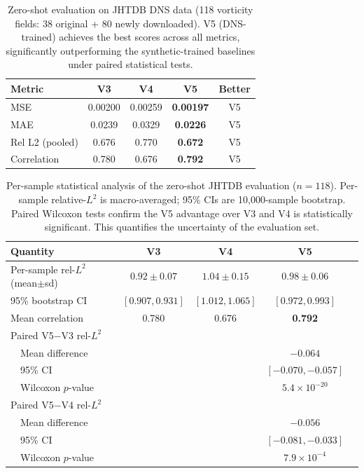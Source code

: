 \documentclass[review]{elsarticle}
\begin{document}
\begin{table}[t]
\centering
\caption{Zero-shot evaluation on JHTDB DNS data (118 vorticity fields: 38 original + 80 newly downloaded). V5 (DNS-trained) achieves the best scores across all metrics, significantly outperforming the synthetic-trained baselines under paired statistical tests.}
\label{tab:jhtdb}
\begin{tabular}{lcccc}
\toprule
Metric & V3 & V4 & V5 & Better \\
\midrule
MSE & 0.00200 & 0.00259 & \textbf{0.00197} & V5 \\
MAE & 0.0239 & 0.0329 & \textbf{0.0226} & V5 \\
Rel L2 (pooled) & 0.676 & 0.770 & \textbf{0.672} & V5 \\
Correlation & 0.780 & 0.676 & \textbf{0.792} & V5 \\
\bottomrule
\end{tabular}
\end{table}

\begin{table}[t]
\centering
\caption{Per-sample statistical analysis of the zero-shot JHTDB evaluation ($n{=}118$). Per-sample relative-$L^2$ is macro-averaged; 95\% CIs are 10{,}000-sample bootstrap. Paired Wilcoxon tests confirm the V5 advantage over V3 and V4 is statistically significant. This quantifies the uncertainty of the evaluation set.}
\label{tab:jhtdb-stats}
\begin{tabular}{lcccc}
\toprule
Quantity & V3 & V4 & V5 & \\
\midrule
Per-sample rel-$L^2$ (mean$\pm$sd) & $0.92 \pm 0.07$ & $1.04 \pm 0.15$ & $0.98 \pm 0.06$ & \\
95\% bootstrap CI & $[0.907, 0.931]$ & $[1.012, 1.065]$ & $[0.972, 0.993]$ & \\
Mean correlation & 0.780 & 0.676 & \textbf{0.792} & \\
\midrule
\multicolumn{3}{l}{Paired V5$-$V3 rel-$L^2$} & & \\
\multicolumn{3}{l}{\ \ Mean difference} & $-0.064$ & \\
\multicolumn{3}{l}{\ \ 95\% CI} & $[-0.070, -0.057]$ & \\
\multicolumn{3}{l}{\ \ Wilcoxon $p$-value} & $5.4\times10^{-20}$ & \\
\midrule
\multicolumn{3}{l}{Paired V5$-$V4 rel-$L^2$} & & \\
\multicolumn{3}{l}{\ \ Mean difference} & $-0.056$ & \\
\multicolumn{3}{l}{\ \ 95\% CI} & $[-0.081, -0.033]$ & \\
\multicolumn{3}{l}{\ \ Wilcoxon $p$-value} & $7.9\times10^{-4}$ & \\
\bottomrule
\end{tabular}
\end{table}
\end{document}
